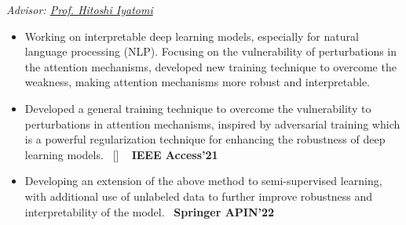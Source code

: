 \begin{projects}
	{
		\textit{Advisor:  \href{https://iyatomi-lab.info/english/people/2013-6-8}{Prof. Hitoshi Iyatomi}}
	}
	{
		\begin{itemize}
			\setlength\itemsep{0.3em}
			\item Working on interpretable deep learning models, especially for natural language processing (NLP). Focusing on the vulnerability of perturbations in the attention mechanisms, developed new training technique to overcome the weakness, making attention mechanisms more robust and interpretable.
			\item Developed a general training technique to overcome the vulnerability to perturbations in attention mechanisms, inspired by adversarial training which is a powerful regularization technique for enhancing the robustness of deep learning models.~ [\href{http://shunk031.github.io/attention-meets-perturbation/}{\small{\websiteSymbol}}] ~ {\small{\lbrack\textbf{{IEEE Access'21}}\rbrack}}
			\item Developing an extension of the above method to semi-supervised learning, with additional use of unlabeled data to further improve robustness and interpretability of the model.~ {\small{\lbrack\textbf{{Springer APIN'22}}\rbrack}}
		\end{itemize}
	}
\end{projects}


